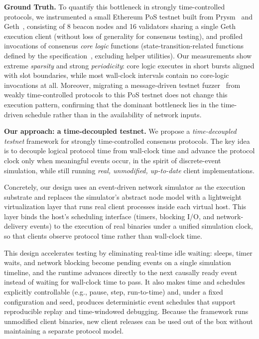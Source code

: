 \smallskip
\noindent\textbf{Ground Truth.} To quantify this bottleneck in strongly time-controlled protocols, we instrumented a small Ethereum PoS testnet built from Prysm~\cite{prysm} and Geth~\cite{go-ethereum}, consisting of 8 beacon nodes and 16 validators sharing a single Geth execution client (without loss of generality for consensus testing), and profiled invocations of consensus \emph{core logic} functions (state-transition-related functions defined by the specification~\cite{ethereum_phase0_2020}, excluding helper utilities).
Our measurements show extreme \emph{sparsity} and strong \emph{periodicity}: core logic executes in short bursts aligned with slot boundaries, while most wall-clock intervals contain no core-logic invocations at all.
Moreover, migrating a message-driven testnet fuzzer~\cite{ma2023loki} from weakly time-controlled protocols to this PoS testnet does not change this execution pattern, confirming that the dominant bottleneck lies in the time-driven schedule rather than in the availability of network inputs.

\smallskip
\noindent\textbf{Our approach: a time-decoupled testnet.}
We propose a \emph{time-decoupled testnet} framework for strongly time-controlled consensus protocols. The key idea is to decouple logical protocol time from wall-clock time and advance the protocol clock only when meaningful events occur, in the spirit of discrete-event simulation, while still running \emph{real, unmodified, up-to-date} client implementations.

Concretely, our design uses an event-driven network simulator as the execution substrate and replaces the simulator's abstract node model with a lightweight virtualization layer that runs real client processes inside each virtual host. This layer binds the host's scheduling interface (timers, blocking I/O, and network-delivery events) to the execution of real binaries under a unified simulation clock, so that clients observe protocol time rather than wall-clock time.

This design accelerates testing by eliminating real-time idle waiting: sleeps, timer waits, and network blocking become pending events on a single simulation timeline, and the runtime advances directly to the next causally ready event instead of waiting for wall-clock time to pass. It also makes time and schedules explicitly controllable (e.g., pause, step, run-to-time) and, under a fixed configuration and seed, produces deterministic event schedules that support reproducible replay and time-windowed debugging. Because the framework runs unmodified client binaries, new client releases can be used out of the box without maintaining a separate protocol model.

